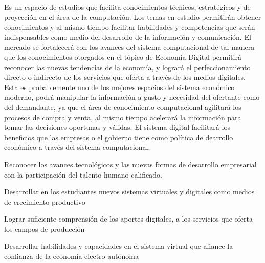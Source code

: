 \begin{syllabus}


\begin{justification}
Es un espacio de estudios que facilita conocimientos técnicos, estratégicos y de proyección en el área de la computación. Los temas en estudio permitirán obtener conocimientos y al mismo tiempo facilitar habilidades y competencias que serán indispensables como medio del desarrollo de la información y comunicación. El mercado se fortalecerá con los avances del sistema computacional de tal manera que los conocimientos otorgados en el tópico de Economía Digital permitirá reconocer las nuevas tendencias de la economía, y logrará el perfeccionamiento directo o indirecto de los servicios que oferta a través de los medios digitales. Esta es probablemente uno de los mejores espacios del sistema económico moderno, podrá manipular la información a gusto y necesidad del ofertante como del demandante, ya que el área de conocimiento computacional agilitará los procesos de compra y venta, al mismo tiempo acelerará la información para tomar las decisiones oportunas y válidas. El sistema digital facilitará los beneficios que las empresas o el gobierno tiene como política de dearrollo económico a través del sistema computacional.
\end{justification}

\begin{goals}
\item Reconocer los avances tecnológicos y las nuevas formas de desarrollo empresarial con la participación del talento humano calificado.
\item Desarrollar en los estudiantes nuevos sistemas virtuales y digitales como medios de crecimiento productivo
\item Lograr suficiente comprensión de los aportes digitales, a los servicios que oferta los campos de producción
\item Desarrollar habilidades y capacidades en el sistema virtual que afiance la confianza de la economía electro-autónoma
\end{goals}

\begin{outcomes}
\end{outcomes}


\end{syllabus}
